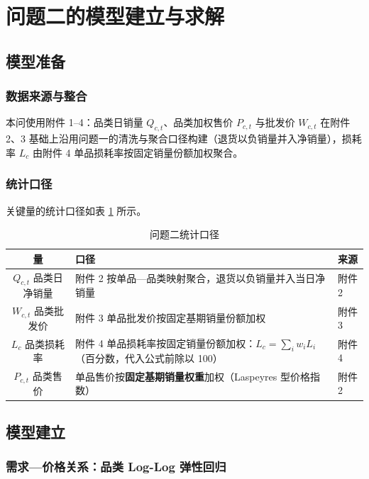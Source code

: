 \section{问题二的模型建立与求解}

\subsection{模型准备}

\subsubsection{数据来源与整合}

本问使用附件 1–4：品类日销量 $Q_{c,t}$、品类加权售价 $P_{c,t}$ 与批发价 $W_{c,t}$ 在附件 2、3 基础上沿用问题一的清洗与聚合口径构建（退货以负销量并入净销量），损耗率 $L_c$ 由附件 4 单品损耗率按固定销量份额加权聚合。

\subsubsection{统计口径}

关键量的统计口径如表 \ref{tab:q2_stats} 所示。

\begin{table}[htbp]
\centering
\caption{问题二统计口径}
\label{tab:q2_stats}
\begin{tabular}{cll}
\toprule
量 & 口径 & 来源 \\
\midrule
$Q_{c,t}$ 品类日净销量 & 附件 2 按单品—品类映射聚合，退货以负销量并入当日净销量 & 附件 2 \\
$W_{c,t}$ 品类批发价 & 附件 3 单品批发价按固定基期销量份额加权 & 附件 3 \\
$L_c$ 品类损耗率 & 附件 4 单品损耗率按固定销量份额加权：$L_c=\sum_i w_i L_i$（百分数，代入公式前除以 100） & 附件 4 \\
$P_{c,t}$ 品类售价 & 单品售价按\textbf{固定基期销量权重}加权（Laspeyres 型价格指数） & 附件 2 \\
\bottomrule
\end{tabular}
\end{table}

\subsection{模型建立}
\label{sec:q2_model}

\subsubsection{需求—价格关系：品类 Log-Log 弹性回归}

